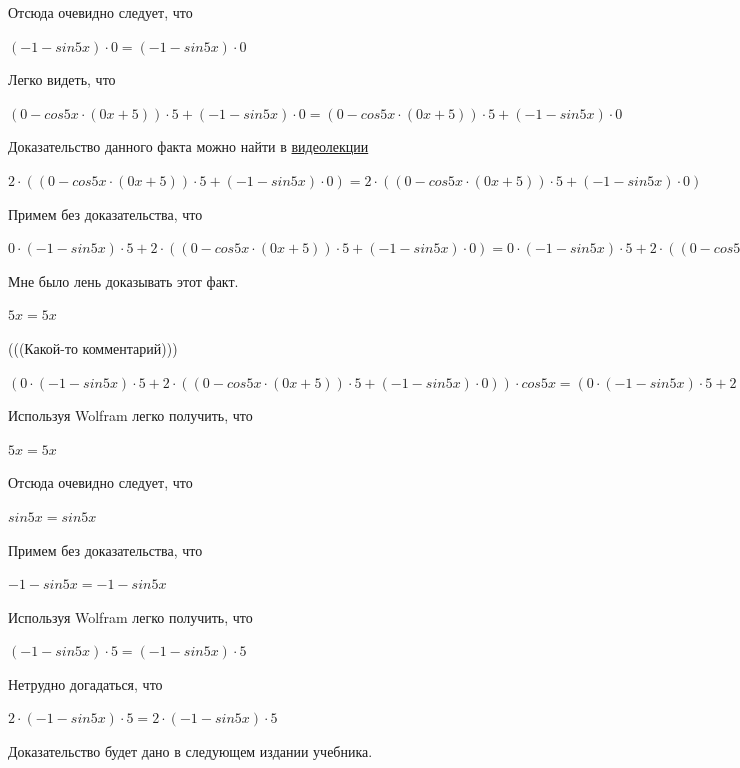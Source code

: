 \documentclass[12pt,a4paper,fleqn]{article}
\theoremstyle{definition}
\begin{document}
Отсюда очевидно следует, что 

$( -1  - sin 5  x ) \cdot  0  = ( -1  - sin 5  x ) \cdot  0 $

Легко видеть, что 

$( 0  - cos 5  x  \cdot ( 0  x  +  5 )) \cdot  5  + ( -1  - sin 5  x ) \cdot  0  = ( 0  - cos 5  x  \cdot ( 0  x  +  5 )) \cdot  5  + ( -1  - sin 5  x ) \cdot  0 $

Доказательство данного факта можно найти в \href{https://www.youtube.com/watch?v=dQw4w9WgXcQ}{видеолекции} 

$ 2  \cdot (( 0  - cos 5  x  \cdot ( 0  x  +  5 )) \cdot  5  + ( -1  - sin 5  x ) \cdot  0 ) =  2  \cdot (( 0  - cos 5  x  \cdot ( 0  x  +  5 )) \cdot  5  + ( -1  - sin 5  x ) \cdot  0 )$

Примем без доказательства, что 

$ 0  \cdot ( -1  - sin 5  x ) \cdot  5  +  2  \cdot (( 0  - cos 5  x  \cdot ( 0  x  +  5 )) \cdot  5  + ( -1  - sin 5  x ) \cdot  0 ) =  0  \cdot ( -1  - sin 5  x ) \cdot  5  +  2  \cdot (( 0  - cos 5  x  \cdot ( 0  x  +  5 )) \cdot  5  + ( -1  - sin 5  x ) \cdot  0 )$

Мне было лень доказывать этот факт.

$ 5  x  =  5  x $

(((Какой-то комментарий))) 

$( 0  \cdot ( -1  - sin 5  x ) \cdot  5  +  2  \cdot (( 0  - cos 5  x  \cdot ( 0  x  +  5 )) \cdot  5  + ( -1  - sin 5  x ) \cdot  0 )) \cdot cos 5  x  = ( 0  \cdot ( -1  - sin 5  x ) \cdot  5  +  2  \cdot (( 0  - cos 5  x  \cdot ( 0  x  +  5 )) \cdot  5  + ( -1  - sin 5  x ) \cdot  0 )) \cdot cos 5  x $

Используя Wolfram легко получить, что 

$ 5  x  =  5  x $

Отсюда очевидно следует, что 

$sin 5  x  = sin 5  x $

Примем без доказательства, что 

$ -1  - sin 5  x  =  -1  - sin 5  x $

Используя Wolfram легко получить, что 

$( -1  - sin 5  x ) \cdot  5  = ( -1  - sin 5  x ) \cdot  5 $

Нетрудно догадаться, что 

$ 2  \cdot ( -1  - sin 5  x ) \cdot  5  =  2  \cdot ( -1  - sin 5  x ) \cdot  5 $

Доказательство будет дано в следующем издании учебника. 
\end{document}
